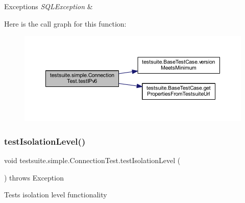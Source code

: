 \begin{DoxyExceptions}{Exceptions}
{\em S\+Q\+L\+Exception} & \\
\hline
\end{DoxyExceptions}
Here is the call graph for this function\+:
\nopagebreak
\begin{figure}[H]
\begin{center}
\leavevmode
\includegraphics[width=350pt]{classtestsuite_1_1simple_1_1_connection_test_aaac71a7d7f1811f8ca555a3f8fb2573b_cgraph}
\end{center}
\end{figure}
\mbox{\label{classtestsuite_1_1simple_1_1_connection_test_a021e6d2e50117ac6af546f9f340e2127}} 
\subsubsection{\texorpdfstring{test\+Isolation\+Level()}{testIsolationLevel()}}
{\footnotesize\ttfamily void testsuite.\+simple.\+Connection\+Test.\+test\+Isolation\+Level (\begin{DoxyParamCaption}{ }\end{DoxyParamCaption}) throws Exception}

Tests isolation level functionality


